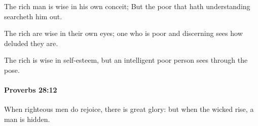 			\begin{versebox}
					\item[BHS] 
					\item[ASV] The rich man is wise in his own conceit; But the poor that hath understanding searcheth him out.
					\item[NIV] The rich are wise in their own eyes; one who is poor and discerning sees how deluded they are.
					\item[NRSV] The rich is wise in self-esteem, but an intelligent poor person sees through the pose.
			\end{versebox}

		\paragraph{Proverbs 28:12} %
			\label{PROVERBS-28-12}

			When righteous men do rejoice, there is great glory: but when the wicked rise, a man is hidden.

